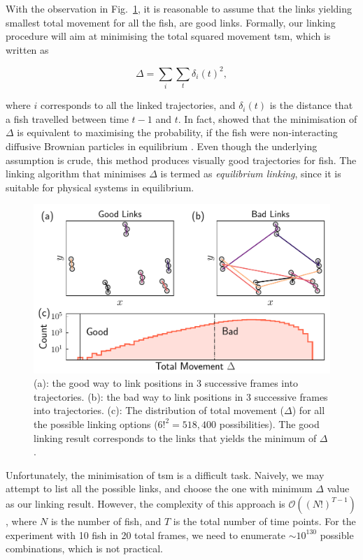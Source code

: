 \documentclass[11pt,twoside]{report}
\begin{document}
With the observation in Fig.~\ref{fig:link-idea}, it is reasonable to assume that the links yielding smallest total movement for all the fish, are good links. Formally, our linking procedure will aim at minimising the total squared movement \gls{tsm}, which is written as 

$$
\Delta = \sum_i\sum_t\delta_i(t)^2,
$$

\noindent where $i$ corresponds to all the linked trajectories, and $\delta_i(t)$ is the distance that a fish travelled between time $t-1$ and $t$. In fact, \citeauthor{crocker1996} showed that the minimisation of $\Delta$ is equivalent to maximising the probability, if the fish were non-interacting diffusive Brownian particles in equilibrium \cite{crocker1996}.
Even though the underlying assumption is crude, this method produces visually good trajectories for fish.
The linking algorithm that minimises $\Delta$ is termed as \emph{equilibrium linking}, since it is suitable for physical systems in equilibrium.


\begin{figure}
  \includegraphics[width=\linewidth]{linking-idea}
  \caption[Linking locations into trajectories: concept illustration]{
  (a): the good way to link positions in 3 successive frames into trajectories.
  (b): the bad way to link positions in 3 successive frames into trajectories.
  (c): The distribution of total movement ($\Delta$) for all the possible linking options ($6!^2=518,400$ possibilities). The good linking result corresponds to the links that yields the minimum of $\Delta$.
  }
  \label{fig:link-idea}
\end{figure}


Unfortunately, the minimisation of \gls{tsm} is a difficult task. Naively, we may attempt to list all the possible links, and choose the one with minimum $\Delta$ value as our linking result. However, the complexity of this approach is $\mathcal{O}((N!)^{T-1})$ \cite{crocker1996}, where $N$ is the number of fish, and $T$ is the total number of time points. For the experiment with 10 fish in 20 total frames, we need to enumerate $\sim 10^{130}$ possible combinations, which is not practical.
\end{document}

